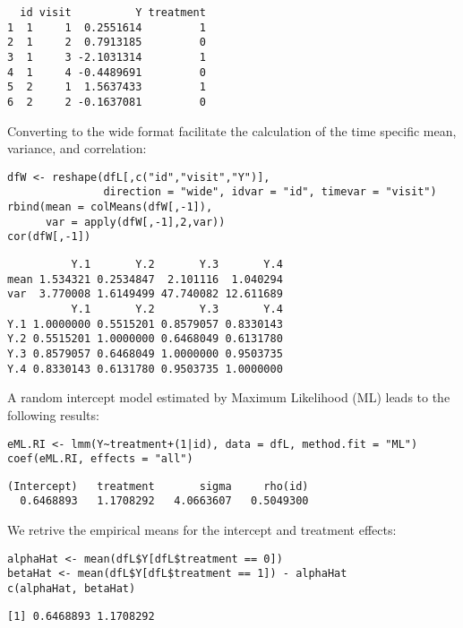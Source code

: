 \documentclass[12pt]{article}
\begin{document}
\begin{verbatim}
  id visit          Y treatment
1  1     1  0.2551614         1
2  1     2  0.7913185         0
3  1     3 -2.1031314         1
4  1     4 -0.4489691         0
5  2     1  1.5637433         1
6  2     2 -0.1637081         0
\end{verbatim}


Converting to the wide format facilitate the calculation of the time
specific mean, variance, and correlation:
\lstset{language=r,label= ,caption= ,captionpos=b,numbers=none}
\begin{lstlisting}
dfW <- reshape(dfL[,c("id","visit","Y")],
               direction = "wide", idvar = "id", timevar = "visit")
rbind(mean = colMeans(dfW[,-1]),
      var = apply(dfW[,-1],2,var))
cor(dfW[,-1])
\end{lstlisting}

\begin{verbatim}
          Y.1       Y.2       Y.3       Y.4
mean 1.534321 0.2534847  2.101116  1.040294
var  3.770008 1.6149499 47.740082 12.611689
          Y.1       Y.2       Y.3       Y.4
Y.1 1.0000000 0.5515201 0.8579057 0.8330143
Y.2 0.5515201 1.0000000 0.6468049 0.6131780
Y.3 0.8579057 0.6468049 1.0000000 0.9503735
Y.4 0.8330143 0.6131780 0.9503735 1.0000000
\end{verbatim}


A random intercept model estimated by Maximum Likelihood (ML) leads to
the following results:
\lstset{language=r,label= ,caption= ,captionpos=b,numbers=none}
\begin{lstlisting}
eML.RI <- lmm(Y~treatment+(1|id), data = dfL, method.fit = "ML")
coef(eML.RI, effects = "all")
\end{lstlisting}

\begin{verbatim}
(Intercept)   treatment       sigma     rho(id) 
  0.6468893   1.1708292   4.0663607   0.5049300
\end{verbatim}


We retrive the empirical means for the intercept and treatment effects:
\lstset{language=r,label= ,caption= ,captionpos=b,numbers=none}
\begin{lstlisting}
alphaHat <- mean(dfL$Y[dfL$treatment == 0])
betaHat <- mean(dfL$Y[dfL$treatment == 1]) - alphaHat
c(alphaHat, betaHat)
\end{lstlisting}

\begin{verbatim}
[1] 0.6468893 1.1708292
\end{verbatim}
\end{document}
